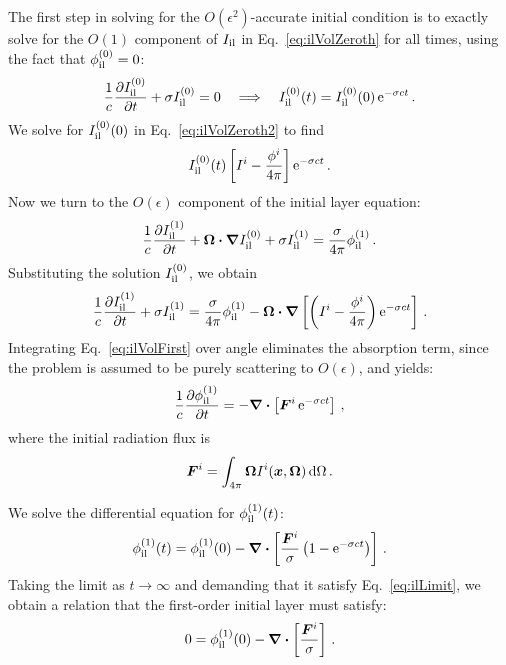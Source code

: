 The first step in solving for the $O(\epsilon^2)$-accurate initial condition is
to exactly solve for the $O(1)$ component of $I_\mathrm{il}$ in
Eq.~\eqref{eq:ilVolZeroth} for all times, using the fact that $\phi_\mathrm{il}^{(0)}=0$:
\begin{equation*}
  \frac{1}{c}\frac{\partial I_\mathrm{il}^{(0)}}{\partial t} + \sigma I_\mathrm{il}^{(0)} = 0
  \quad \Longrightarrow \quad I_\mathrm{il}^{(0)}(t) = I_\mathrm{il}^{(0)}(0) \mathop{}\!\mathrm{e}^{-\sigma c t} \,.
\end{equation*}
We solve for $I_\mathrm{il}^{(0)}(0)$ in Eq.~\eqref{eq:ilVolZeroth2} to find
\begin{equation*}
 I_\mathrm{il}^{(0)}(t) \left[ I^i - \frac{\phi^i}{4\pi} \right] \mathop{}\!\mathrm{e}^{-\sigma c t}\,.
\end{equation*}
Now we turn to the $O(\epsilon)$ component of the initial layer equation:
\begin{equation*}
  \frac{1}{c}\frac{\partial I_\mathrm{il}^{(1)}}{\partial t}
  + \bm{\Omega}\bm{\cdot} \bm{\nabla} I_\mathrm{il}^{(0)}
  + \sigma I_\mathrm{il}^{(1)}
  = \frac{\sigma}{4\pi} \phi_\mathrm{il}^{(1)} \,.
\end{equation*}
Substituting the solution $I_\mathrm{il}^{(0)}$, we obtain
\begin{equation}\label{eq:ilVolFirst}
  \frac{1}{c}\frac{\partial I_\mathrm{il}^{(1)}}{\partial t}
  + \sigma I_\mathrm{il}^{(1)}
  = \frac{\sigma}{4\pi} \phi_\mathrm{il}^{(1)}
  -  \bm{\Omega}\bm{\cdot} \bm{\nabla} \left[\left(  I^i - \frac{\phi^i}{4\pi} \right)
    \mathop{}\!\mathrm{e}^{-\sigma c t} \right] \,.
\end{equation}
Integrating Eq.~\eqref{eq:ilVolFirst} over angle eliminates the absorption
term, since the problem is assumed to be purely scattering to $O(\epsilon)$,
and yields:
\begin{equation*}
  \frac{1}{c}\frac{\partial \phi_\mathrm{il}^{(1)}}{\partial t}
  = - \bm{\nabla} \bm{\cdot} \left[\bm{F}^i \mathop{}\!\mathrm{e}^{-\sigma c t} \right] \,,
\end{equation*}
where the initial radiation flux is
\begin{equation*}
  \bm{F}^i = \int_{4\pi} \bm{\Omega} I^i(\bm{x},\bm{\Omega})\mathop{}\!\mathrm{d}\Omega\,.
\end{equation*}

We solve the differential equation for $\phi_\mathrm{il}^{(1)}(t)$:
\begin{equation*}
  \phi_\mathrm{il}^{(1)}(t) = \phi_\mathrm{il}^{(1)}(0) - \bm{\nabla} \bm{\cdot} \left[\frac{\bm{F}^i}{\sigma}
    \left( 1 - \mathop{}\!\mathrm{e}^{-\sigma c t} \right) \right] \,.
\end{equation*}
Taking the limit as $t\to\infty$ and demanding that it satisfy
Eq.~\eqref{eq:ilLimit}, we obtain a relation that the first-order initial
layer must satisfy:
\begin{equation}\label{eq:ilVolFirst2}
  0 = \phi_\mathrm{il}^{(1)}(0) - \bm{\nabla} \bm{\cdot} \left[\frac{\bm{F}^i}{\sigma} \right] \,.
\end{equation}

